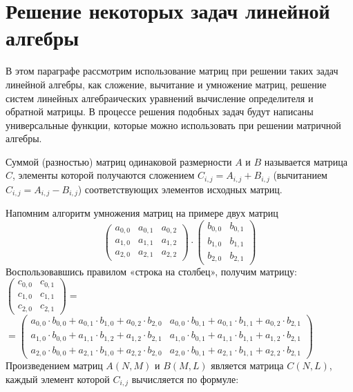 \section[Решение некоторых задач линейной алгебры]{Решение некоторых задач линейной алгебры}
В этом параграфе рассмотрим использование матриц при решении таких задач линейной алгебры, как сложение, вычитание и
умножение матриц, решение систем линейных алгебраических уравнений вычисление определителя и обратной матрицы. В
процессе решения подобных задач будут написаны универсальные функции, которые можно использовать при решении матричной
алгебры.


Суммой (разностью) матриц одинаковой размерности $A$ и $B$ называется матрица $C$, элементы которой получаются сложением 
$C_{i,j}=A_{i,j}+B_{i,j}$ (вычитанием  $C_{i,j}=A_{i,j}-B_{i,j}$) соответствующих элементов исходных матриц. 

Напомним алгоритм умножения матриц на примере двух матриц 
$$\left(\begin{matrix}a_{0,0}&a_{0,1}&a_{0,2}\\a_{1,0}&a_{1,1}&a_{1,2}\\a_{2,0}&a_{2,1}&a_{2,2}\end{matrix}\right)\cdot
\left(\begin{matrix}b_{0,0}&b_{0,1}\\b_{1,0}&b_{1,1}\\b_{2,0}&b_{2,1}\end{matrix}\right)$$ 
Воспользовавшись правилом «строка на столбец», получим матрицу: 
{\noindent%
$\left(\begin{matrix}c_{0,0}&c_{0,1}\\c_{1,0}&c_{1,1}\\c_{2,0}&c_{2,1}\end{matrix}\right)=$\\
$=\left(\begin{matrix}a_{0,0}\cdot
b_{0,0}+a_{0,1}\cdot b_{1,0}+a_{0,2}\cdot b_{2,0}&a_{0,0}\cdot b_{0,1}+a_{0,1}\cdot b_{1,1}+a_{0,2}\cdot
b_{2,1}\\a_{1,0}\cdot b_{0,0}+a_{1,1}\cdot b_{1,2}+a_{1,2}\cdot b_{2,1}&a_{1,0}\cdot b_{0,1}+a_{1,1}\cdot
b_{1,1}+a_{1,2}\cdot b_{2,1}\\a_{2,0}\cdot b_{0,0}+a_{2,1}\cdot b_{1,0}+a_{2,2}\cdot b_{2,0}&a_{2,0}\cdot
b_{0,1}+a_{2,1}\cdot b_{1,1}+a_{2,2}\cdot b_{2,1}\end{matrix}\right)$
}
Произведением матриц $A(N,M)$ и $B(M,L)$ является матрица $C(N,L)$, каждый элемент которой  $C_{i,j}$ вычисляется по формуле:

